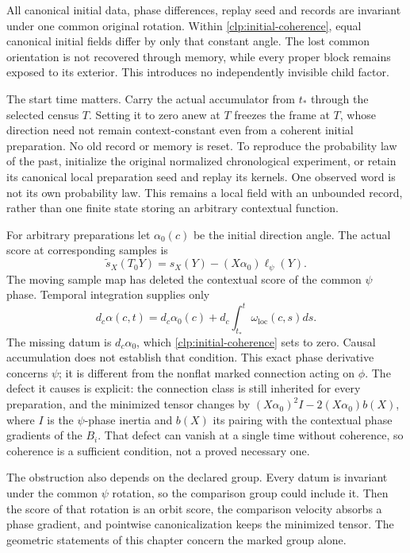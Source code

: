 All canonical initial data, phase differences, replay seed and records are invariant under one common original rotation. Within \cref{clp:initial-coherence}, equal canonical initial fields differ by only that constant angle. The lost common orientation is not recovered through memory, while every proper block remains exposed to its exterior. This introduces no independently invisible child factor.

The start time matters. Carry the actual accumulator from $t_*$ through the selected census $T$. Setting it to zero anew at $T$ freezes the frame at $T$, whose direction need not remain context-constant even from a coherent initial preparation. No old record or memory is reset. To reproduce the probability law of the past, initialize the original normalized chronological experiment, or retain its canonical local preparation seed and replay its kernels. One observed word is not its own probability law. This remains a local field with an unbounded record, rather than one finite state storing an arbitrary contextual function.

For arbitrary preparations let $\alpha_0(c)$ be the initial direction angle. The actual score at corresponding samples is
\begin{equation}
 \widetilde s_X(T_0Y)=s_X(Y)-(X\alpha_0)\ell_\psi(Y).
 \label{clp:causal-score-defect}
\end{equation}
The moving sample map has deleted the contextual score of the common $\psi$ phase. Temporal integration supplies only
\begin{equation}
 d_c\alpha(c,t)=d_c\alpha_0(c)
 +d_c\int_{t_*}^t\omega_{\mathrm{loc}}(c,s)ds.
 \label{clp:causal-initial-datum}
\end{equation}
The missing datum is $d_c\alpha_0$, which \cref{clp:initial-coherence} sets to zero. Causal accumulation does not establish that condition. This exact phase derivative concerns $\psi$; it is different from the nonflat marked connection acting on $\phi$. The defect it causes is explicit: the connection class is still inherited for every preparation, and the minimized tensor changes by $(X\alpha_0)^2I-2(X\alpha_0)b(X)$, where $I$ is the $\psi$-phase inertia and $b(X)$ its pairing with the contextual phase gradients of the $B_i$. That defect can vanish at a single time without coherence, so coherence is a sufficient condition, not a proved necessary one.

The obstruction also depends on the declared group. Every datum is invariant under the common $\psi$ rotation, so the comparison group could include it. Then the score of that rotation is an orbit score, the comparison velocity absorbs a phase gradient, and pointwise canonicalization keeps the minimized tensor. The geometric statements of this chapter concern the marked group alone.

